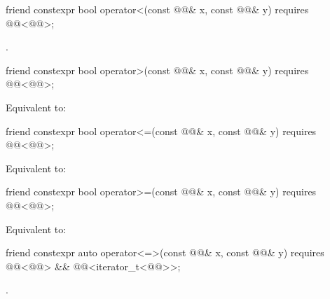 \begin{itemdecl}
friend constexpr bool operator<(const @@& x, const @@& y)
  requires @@<@@>;
\end{itemdecl}

\begin{itemdescr}
\pnum
\returns
{}.
\end{itemdescr}

\begin{itemdecl}
friend constexpr bool operator>(const @@& x, const @@& y)
  requires @@<@@>;
\end{itemdecl}

\begin{itemdescr}
\pnum
\effects
Equivalent to: 
\end{itemdescr}

\begin{itemdecl}
friend constexpr bool operator<=(const @@& x, const @@& y)
  requires @@<@@>;
\end{itemdecl}

\begin{itemdescr}
\pnum
\effects
Equivalent to: 
\end{itemdescr}

\begin{itemdecl}
friend constexpr bool operator>=(const @@& x, const @@& y)
  requires @@<@@>;
\end{itemdecl}

\begin{itemdescr}
\pnum
\effects
Equivalent to: 
\end{itemdescr}

\begin{itemdecl}
friend constexpr auto operator<=>(const @@& x, const @@& y)
  requires @@<@@> &&
           @@<iterator_t<@@>>;
\end{itemdecl}

\begin{itemdescr}
\pnum
\returns
{}.
\end{itemdescr}

